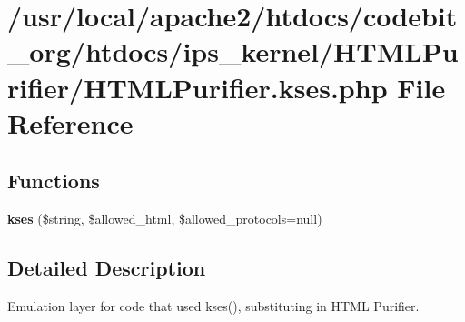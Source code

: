 \hypertarget{_h_t_m_l_purifier_8kses_8php}{\section{/usr/local/apache2/htdocs/codebit\-\_\-org/htdocs/ips\-\_\-kernel/\-H\-T\-M\-L\-Purifier/\-H\-T\-M\-L\-Purifier.kses.\-php File Reference}
\label{_h_t_m_l_purifier_8kses_8php}
}
\subsection*{Functions}
\begin{DoxyCompactItemize}
\item 
\hypertarget{_h_t_m_l_purifier_8kses_8php_ab30da7ac07bb92c84afdd61806c2cff9}{{\bfseries kses} (\$string, \$allowed\-\_\-html, \$allowed\-\_\-protocols=null)}\label{_h_t_m_l_purifier_8kses_8php_ab30da7ac07bb92c84afdd61806c2cff9}

\end{DoxyCompactItemize}


\subsection{Detailed Description}
Emulation layer for code that used kses(), substituting in H\-T\-M\-L Purifier. 